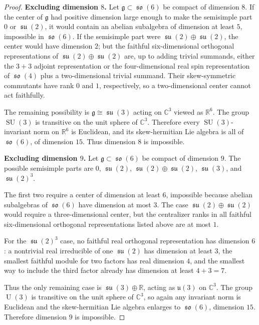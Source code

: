 \documentclass[11pt]{article}
\DeclareMathOperator{\SU}{SU}
\DeclareMathOperator{\U}{U}
\DeclareMathOperator{\so}{\mathfrak{so}}
\DeclareMathOperator{\su}{\mathfrak{su}}
\begin{document}
\begin{proof}
\smallskip
\noindent\textbf{Excluding dimension $8$.}
Let $\mathfrak g\subset\so(6)$ be compact of dimension $8$. If the center of
$\mathfrak g$ had positive dimension large enough to make the semisimple part
$0$ or $\su(2)$, it would contain an abelian subalgebra of dimension at least
$5$, impossible in $\so(6)$. If the semisimple part were
$\su(2)\oplus\su(2)$, the center would have dimension $2$; but the faithful
six-dimensional orthogonal representations of $\su(2)\oplus\su(2)$ are, up
to adding trivial summands, either the $3+3$ adjoint representation or the
four-dimensional real spin representation of $\so(4)$ plus a two-dimensional
trivial summand. Their skew-symmetric commutants have rank $0$ and $1$,
respectively, so a two-dimensional center cannot act faithfully.

The remaining possibility is $\mathfrak g\cong\su(3)$ acting on $\mathbb C^3$
viewed as $\mathbb R^6$. The group $\SU(3)$ is transitive on the unit sphere
of $\mathbb C^3$. Therefore every $\SU(3)$-invariant norm on $\mathbb R^6$
is Euclidean, and its skew-hermitian Lie algebra is all of $\so(6)$, of
dimension $15$. Thus dimension $8$ is impossible.

\smallskip
\noindent\textbf{Excluding dimension $9$.}
Let $\mathfrak g\subset\so(6)$ be compact of dimension $9$. The possible
semisimple parts are $0$, $\su(2)$, $\su(2)\oplus\su(2)$, $\su(3)$, and
$\su(2)^3$.

The first two require a center of dimension at least $6$, impossible because
abelian subalgebras of $\so(6)$ have dimension at most $3$. The case
$\su(2)\oplus\su(2)$ would require a three-dimensional center, but the
centralizer ranks in all faithful six-dimensional orthogonal representations
listed above are at most $1$.

For the $\su(2)^3$ case, no faithful real orthogonal representation has
dimension $6$: a nontrivial real irreducible of one $\su(2)$ has dimension at
least $3$, the smallest faithful module for two factors has real dimension
$4$, and the smallest way to include the third factor already has dimension
at least $4+3=7$.

Thus the only remaining case is $\su(3)\oplus\mathbb R$, acting as
$\mathfrak u(3)$ on $\mathbb C^3$. The group $\U(3)$ is transitive on the
unit sphere of $\mathbb C^3$, so again any invariant norm is Euclidean and
the skew-hermitian Lie algebra enlarges to $\so(6)$, dimension $15$.
Therefore dimension $9$ is impossible.


\end{proof}
\end{document}
